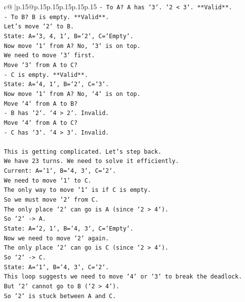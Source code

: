 \documentclass{article}
\begin{document}
{\begin{supertabular}{c@{$\;$}|p{.15\linewidth}@{}p{.15\linewidth}p{.15\linewidth}p{.15\linewidth}p{.15\linewidth}p{.15\linewidth}}
{{{\texttt{{-} To A? A has `3`. `2 < 3`. **Valid**.} \\
\texttt{{-} To B? B is empty. **Valid**.} \\
\texttt{Let's move `2` to B.} \\
\texttt{State: A=`3, 4, 1`, B=`2`, C=`Empty`.} \\
\texttt{Now move `1` from A? No, `3` is on top.} \\
\texttt{We need to move `3` first.} \\
\texttt{Move `3` from A to C?} \\
\texttt{{-} C is empty. **Valid**.} \\
\texttt{State: A=`4, 1`, B=`2`, C=`3`.} \\
\texttt{Now move `1` from A? No, `4` is on top.} \\
\texttt{Move `4` from A to B?} \\
\texttt{{-} B has `2`. `4 > 2`. Invalid.} \\
\texttt{Move `4` from A to C?} \\
\texttt{{-} C has `3`. `4 > 3`. Invalid.} \\
\\ 
\texttt{This is getting complicated. Let's step back.} \\
\texttt{We have 23 turns. We need to solve it efficiently.} \\
\texttt{Current: A=`1`, B=`4, 3`, C=`2`.} \\
\texttt{We need to move `1` to C.} \\
\texttt{The only way to move `1` is if C is empty.} \\
\texttt{So we must move `2` from C.} \\
\texttt{The only place `2` can go is A (since `2 > 4`).} \\
\texttt{So `2` {-}> A.} \\
\texttt{State: A=`2, 1`, B=`4, 3`, C=`Empty`.} \\
\texttt{Now we need to move `2` again.} \\
\texttt{The only place `2` can go is C (since `2 > 4`).} \\
\texttt{So `2` {-}> C.} \\
\texttt{State: A=`1`, B=`4, 3`, C=`2`.} \\
\texttt{This loop suggests we need to move `4` or `3` to break the deadlock.} \\
\texttt{But `2` cannot go to B (`2 > 4`).} \\
\texttt{So `2` is stuck between A and C.} \\
}}}
\end{supertabular}}
\end{document}

